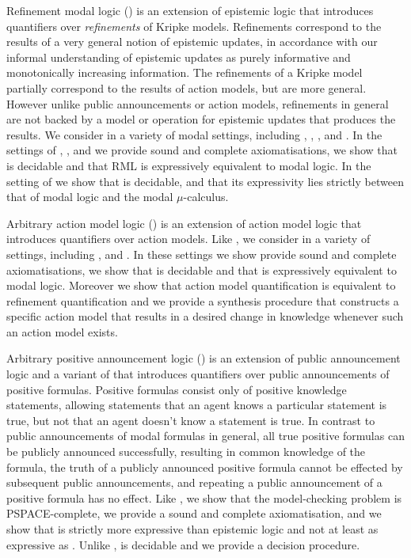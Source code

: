 Refinement modal logic (\logicRml{}) is an extension of epistemic logic that introduces quantifiers over {\em refinements} of Kripke models.
Refinements correspond to the results of a very general notion of epistemic updates, in accordance with our informal understanding of epistemic updates as purely informative and monotonically increasing information.
The refinements of a Kripke model partially correspond to the results of action models, but are more general.
However unlike public announcements or action models, refinements in general are not backed by a model or operation for epistemic updates that produces the results.
We consider \logicRml{} in a variety of modal settings, including \classK{}, \classKF{}, \classKFF{}, \classKD{} and \classS{}.
In the settings of \classK{}, \classKFF{}, \classKD{} and \classS{} we provide sound and complete axiomatisations, we show that \logicRml{} is decidable and that RML is expressively equivalent to modal logic.
In the setting of \classKF{} we show that \logicRml{} is decidable, and that its expressivity lies strictly between that of modal logic and the modal $\mu$-calculus.

Arbitrary action model logic (\logicAaml{}) is an extension of action model logic that introduces quantifiers over action models.
Like \logicRml{}, we consider \logicAaml{} in a variety of settings, including \classK{}, \classKFF{} and \classS{}.
In these settings we show provide sound and complete axiomatisations, we show that \logicAaml{} is decidable and that \logicAaml{} is expressively equivalent to modal logic.
Moreover we show that action model quantification is equivalent to refinement quantification and we provide a synthesis procedure that constructs a specific action model that results in a desired change in knowledge whenever such an action model exists.

Arbitrary positive announcement logic (\logicPapal{}) is an extension of public announcement logic and a variant of \logicApal{} that introduces quantifiers over public announcements of positive formulas.
Positive formulas consist only of positive knowledge statements, allowing statements that an agent knows a particular statement is true, but not that an agent doesn't know a statement is true.
In contrast to public announcements of modal formulas in general, all true positive formulas can be publicly announced successfully, resulting in common knowledge of the formula, the truth of a publicly announced positive formula cannot be effected by subsequent public announcements, and repeating a public announcement of a positive formula has no effect.
Like \logicApal{}, we show that the model-checking problem is PSPACE-complete, we provide a sound and complete axiomatisation, and we show that \logicPapal{} is strictly more expressive than epistemic logic and not at least as expressive as \logicApal{}.
Unlike \logicApal{}, \logicPapal{} is decidable and we provide a decision procedure.


